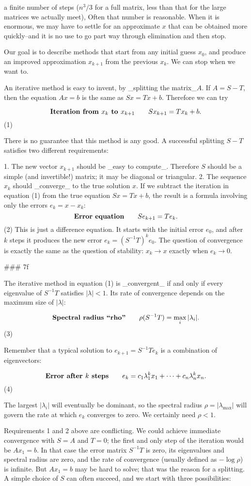 a finite number of steps (\(n^{3}/3\) for a full matrix, less than that for the large matrices we actually meet), Often that number is reasonable. When it is enormous, we may have to settle for an approximate \(x\) that can be obtained more quickly--and it is no use to go part way through elimination and then stop.

Our goal is to describe methods that start from any initial guess \(x_{0}\), and produce an improved approximation \(x_{k+1}\) from the previous \(x_{k}\). We can stop when we want to.

An iterative method is easy to invent, by _splitting the matrix_\(A\). If \(A=S-T\), then the equation \(Ax=b\) is the same as \(Sx=Tx+b\). Therefore we can try

\[\mbox{\bf Iteration from $x_{k}$ to $x_{k+1}$}\qquad Sx_{k+1}=Tx_{k}+b.\] (1)

There is no guarantee that this method is any good. A successful splitting \(S-T\) satisfies two different requirements:

1. The new vector \(x_{k+1}\) should be _easy to compute_. Therefore \(S\) should be a simple (and invertible!) matrix; it may be diagonal or triangular.
2. The sequence \(x_{k}\) should _converge_ to the true solution \(x\). If we subtract the iteration in equation (1) from the true equation \(Sx=Tx+b\), the result is a formula involving only the errors \(e_{k}=x-x_{k}\): \[\mbox{\bf Error equation}\qquad Se_{k+1}=Te_{k}.\] (2) This is just a difference equation. It starts with the initial error \(e_{0}\), and after \(k\) steps it produces the new error \(e_{k}=(S^{-1}T)^{k}e_{0}\). The question of convergence is exactly the same as the question of stability: \(x_{k}\to x\) exactly when \(e_{k}\to 0\).

### 7f

The iterative method in equation (1) is _convergent_ if and only if every eigenvalue of \(S^{-1}T\) satisfies \(|\lambda|<1\). Its rate of convergence depends on the maximum size of \(|\lambda|\):

\[\mbox{\bf Spectral radius ``rho''}\qquad\rho(S^{-1}T)=\max_{i}|\lambda_{i}|.\] (3)

Remember that a typical solution to \(e_{k+1}=S^{-1}Te_{k}\) is a combination of eigenvectors:

\[\mbox{\bf Error after $k$ steps}\qquad e_{k}=c_{1}\lambda_{1}^{k}x_{1}+ \cdots+c_{n}\lambda_{n}^{k}x_{n}.\] (4)

The largest \(|\lambda_{i}|\) will eventually be dominant, so the spectral radius \(\rho=|\lambda_{\max}|\) will govern the rate at which \(e_{k}\) converges to zero. We certainly need \(\rho<1\).

Requirements 1 and 2 above are conflicting. We could achieve immediate convergence with \(S=A\) and \(T=0\); the first and only step of the iteration would be \(Ax_{1}=b\). In that case the error matrix \(S^{-1}T\) is zero, its eigenvalues and spectral radius are zero, and the rate of convergence (usually defined as \(-\log\rho\)) is infinite. But \(Ax_{1}=b\) may be hard to solve; that was the reason for a splitting. A simple choice of \(S\) can often succeed, and we start with three possibilities: 
